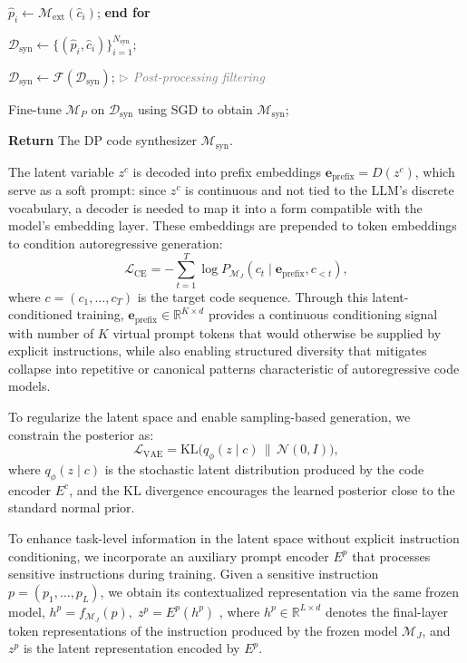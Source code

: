 \documentclass{article}
\theoremstyle{plain}
\theoremstyle{definition}
\theoremstyle{remark}
\begin{document}
\begin{algorithm}[t]
\begin{algorithmic}[1]
\STATE \quad $\hat{p}_i \gets \mathcal{M}_{\text{ext}}(\hat{c}_i)$;
\STATE \textbf{end for}

\STATE $\mathcal{D}_{\text{syn}} \gets \{(\hat{p}_i, \hat{c}_i)\}_{i=1}^{N_{\text{syn}}}$;

\STATE $\mathcal{D}_{\text{syn}} \gets \mathcal{F}(\mathcal{D}_{\text{syn}})$; 
\hfill {\small\textcolor{gray}{\textit{$\triangleright$ Post-processing filtering}}}

\STATE Fine-tune $\mathcal{M}_P$ on $\mathcal{D}_{\text{syn}}$ using SGD to obtain $\mathcal{M}_{\text{syn}}$;

\STATE \textbf{Return} The DP code synthesizer $\mathcal{M}_{\text{syn}}$.

\end{algorithmic}
\end{algorithm}


The latent variable $z^c$ is decoded into prefix embeddings $\mathbf{e}_{\text{prefix}} = D(z^c)$, which serve as a soft prompt: since $z^c$ is continuous and not tied to the LLM’s discrete vocabulary, a decoder is needed to map it into a form compatible with the model’s embedding layer. These embeddings are prepended to token embeddings to condition autoregressive generation:
\begin{equation}
\mathcal{L}_{\text{CE}} = - \sum_{t=1}^T \log P_{\mathcal{M}_J}(c_t \mid \mathbf{e}_{\text{prefix}}, c_{<t}),
\end{equation}
where $c = (c_1, \dots, c_T)$ is the target code sequence. 
Through this latent-conditioned training, $\mathbf{e}_{\text{prefix}}\in \mathbb{R}^{K \times d}$ provides a continuous conditioning signal with number of $K$ virtual prompt tokens that would otherwise be supplied by explicit instructions, while also enabling structured diversity that mitigates collapse into repetitive or canonical patterns characteristic of autoregressive code models.

To regularize the latent space and enable sampling-based generation, we constrain the posterior as:
\begin{equation}
\mathcal{L}_{\text{VAE}} = \mathrm{KL}\big(q_\phi(z \mid c)\,\|\,\mathcal{N}(0, I)\big),
\end{equation}
where $q_\phi(z \mid c)$ is the stochastic latent distribution produced by the code encoder $E^c$, and the KL divergence encourages the learned posterior close to the standard normal prior.

To enhance task-level information in the latent space without explicit instruction conditioning, we incorporate an auxiliary prompt encoder $E^p$ that processes sensitive instructions during training. 
Given a sensitive instruction $p = (p_1, \dots, p_L)$, we obtain its contextualized representation via the same frozen model,
$h^p = f_{\mathcal{M}_J}(p),
\;
z^p = E^p(h^p)$
, where $h^p \in \mathbb{R}^{L \times d}$ denotes the final-layer token representations of the instruction produced by the frozen model $\mathcal{M}_J$, and $z^p$ is the latent representation encoded by $E^p$.
\end{document}
